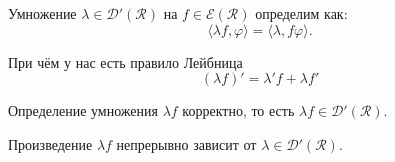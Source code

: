 \begin{to_def}
	Умножение $\lambda \in \mathcal{D}'(\mathcal{R})$ на $f \in \mathcal{E}(\mathcal{R})$ определим как:
	\begin{equation*}
		\langle \lambda f, \varphi\rangle = \langle \lambda, f \varphi\rangle.
	\end{equation*}
\end{to_def}
При чём у нас есть правило Лейбница \begin{equation*}
		(\lambda f)' = \lambda' f + \lambda f'
\end{equation*}

\begin{to_lem}
	Определение умножения $\lambda f$ корректно, то есть $\lambda f \in \mathcal{D}'(\mathcal{R})$.
\end{to_lem}

\begin{to_lem}
	Произведение $\lambda f$ непрерывно зависит от $\lambda \in \mathcal{D}'(\mathcal{R})$.
\end{to_lem}